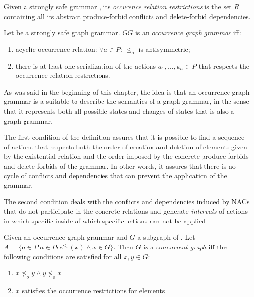 \begin{definition} Given a strongly safe grammar \doublyTypedGraphGrammarCore{}, its \emph{occurence relation restrictions} is the set $R$ containing all its abstract produce-forbid conflicts and delete-forbid dependencies.
\end{definition}

\begin{definition} Let \doublyTypedGraphGrammarCore{} be a strongly safe graph grammar. $GG$ is an \emph{occurrence graph grammar} iff:

  \begin{enumerate}
    \item acyclic occurrence relation: $\forall a \in P$: $\leq_o$ is antisymmetric;
    \item there is at least one serialization of the actions $a_1,\ldots,a_n \in P$ that respects the occurrence relation restrictions.
  \end{enumerate}
\end{definition}

As was said in the beginning of this chapter, the idea is that an occurrence graph grammar is a suitable to describe the semantics of a graph grammar, in the sense that it represents both all possible states and changes of states that is also a graph grammar.

The first condition of the definition assures that it is possible to find a sequence of actions that respects both the order of creation and deletion of elements given by the existential relation and the order imposed by the concrete produce-forbids and delete-forbids of the grammar. In other words, it assures that there is no cycle of conflicts and dependencies that can prevent the application of the grammar.

The second condition deals with the conflicts and dependencies induced by NACs that do not participate in the concrete relations and generate \emph{intervals} of actions in which specific inside of which specific actions can not be applied.


\begin{definition} Given \doublyTypedGraphGrammarCore{} an occurrence graph grammar and $G$ a subgraph of \coreGraph{}. Let \mbox{$A = \{a \in P | a\in Pre^{\leq_o}(x) \land x \in G\}$}. Then $G$ is a \emph{concurrent graph} iff the following conditions are satisfied for all $x,y \in G$:

\begin{enumerate}
  \item $x \not\leq_o y \land y \not\leq_o x$
  \item $x$ satisfies the occurrence restrictions for elements
\end{enumerate}

\end{definition}

